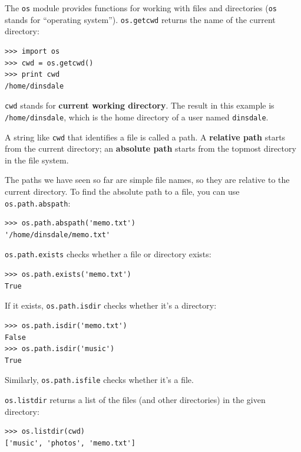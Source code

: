 \documentclass[10pt]{book}
\begin{document}

The {\tt os} module provides functions for working with files and
directories ({\tt os} stands for ``operating system'').  {\tt os.getcwd}
returns the name of the current directory:


\beforeverb
\begin{verbatim}
>>> import os
>>> cwd = os.getcwd()
>>> print cwd
/home/dinsdale
\end{verbatim}
\afterverb
%
{\tt cwd} stands for {\bf current working directory}.  The result in
this example is {\tt /home/dinsdale}, which is the home directory of a
user named {\tt dinsdale}.


A string like {\tt cwd} that identifies a file is called a path.
A {\bf relative path} starts from the current directory;
an {\bf absolute path} starts from the topmost directory in the
file system.


The paths we have seen so far are simple file names, so they are
relative to the current directory.  To find the absolute path to
a file, you can use {\tt os.path.abspath}:

\beforeverb
\begin{verbatim}
>>> os.path.abspath('memo.txt')
'/home/dinsdale/memo.txt'
\end{verbatim}
\afterverb
%
{\tt os.path.exists} checks
whether a file or directory exists:


\beforeverb
\begin{verbatim}
>>> os.path.exists('memo.txt')
True
\end{verbatim}
\afterverb
%
If it exists, {\tt os.path.isdir} checks whether it's a directory:

\beforeverb
\begin{verbatim}
>>> os.path.isdir('memo.txt')
False
>>> os.path.isdir('music')
True
\end{verbatim}
\afterverb
%
Similarly, {\tt os.path.isfile} checks whether it's a file.

{\tt os.listdir} returns a list of the files (and other directories)
in the given directory:

\beforeverb
\begin{verbatim}
>>> os.listdir(cwd)
['music', 'photos', 'memo.txt']
\end{verbatim}
\afterverb
%
\end{document}
